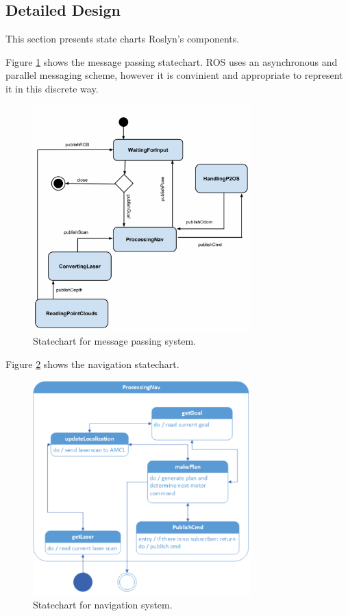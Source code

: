 \documentclass[11pt]{report}
\begin{document}
\subsection{Detailed Design}
This section presents state charts Roslyn's components.

Figure \ref{fig:Low_level_message_passing_diagram} shows the message passing statechart. ROS uses an asynchronous and parallel messaging scheme, however it is convinient and appropriate to represent it in this discrete way.
\begin{figure}[H]
 \centering
 \includegraphics[width=0.75\textwidth]{Low_level_message_passing_diagram.pdf}
 \caption{Statechart for message passing system.}
 \label{fig:Low_level_message_passing_diagram}
\end{figure}

Figure \ref{fig:processing_nav_statechart} shows the navigation statechart.
\begin{figure}[H]
 \centering
 \includegraphics[width=0.75\textwidth]{processing_nav_statechart.pdf}
 \caption{Statechart for navigation system.}
 \label{fig:processing_nav_statechart}
\end{figure}
\end{document}
